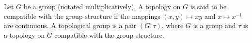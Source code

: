 Let $G$ be a group (notated multiplicatively). A topology on $G$ is said to be compatible with the group structure if the mappings $(x, y) \mapsto xy$ and $x \mapsto x^{-1}$ are continuous. A topological group is a pair $(G, \tau)$, where $G$ is a group and $\tau$ is a topology on $G$ compatible with the group structure.
